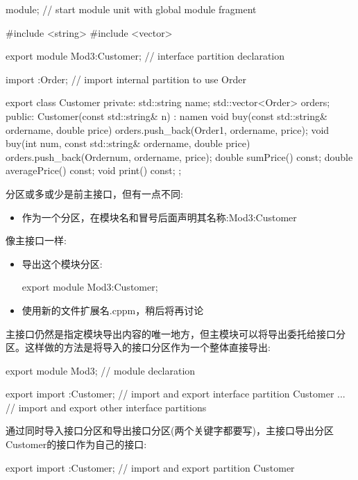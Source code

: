 \begin{cpp}
module; // start module unit with global module fragment

#include <string>
#include <vector>

export module Mod3:Customer; // interface partition declaration

import :Order; // import internal partition to use Order

export class Customer {
private:
	std::string name;
	std::vector<Order> orders;
public:
	Customer(const std::string& n)
	: name{n} {
	}
	void buy(const std::string& ordername, double price) {
		orders.push_back(Order{1, ordername, price});
	}
	void buy(int num, const std::string& ordername, double price) {
		orders.push_back(Order{num, ordername, price});
	}
	double sumPrice() const;
	double averagePrice() const;
	void print() const;
};
\end{cpp}

分区或多或少是前主接口，但有一点不同:

\begin{itemize}
\item
作为一个分区，在模块名和冒号后面声明其名称:Mod3:Customer
\end{itemize}

像主接口一样:

\begin{itemize}
\item
导出这个模块分区:

\begin{cpp}
export module Mod3:Customer;
\end{cpp}

\item
使用新的文件扩展名.cppm，稍后将再讨论
\end{itemize}

主接口仍然是指定模块导出内容的唯一地方，但主模块可以将导出委托给接口分区。这样做的方法是将导入的接口分区作为一个整体直接导出:


\begin{cpp}
export module Mod3; // module declaration

export import :Customer; // import and export interface partition Customer
... // import and export other interface partitions
\end{cpp}

通过同时导入接口分区和导出接口分区(两个关键字都要写)，主接口导出分区Customer的接口作为自己的接口:

\begin{cpp}
export import :Customer; // import and export partition Customer
\end{cpp}

